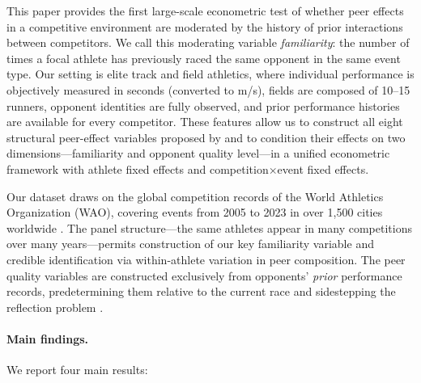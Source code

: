 \documentclass[12pt]{article}
\theoremstyle{definition}
\theoremstyle{remark}
\begin{document}
This paper provides the first large-scale econometric test of whether peer effects
in a competitive environment are moderated by the history of prior interactions
between competitors.
We call this moderating variable \textit{familiarity}: the number of times
a focal athlete has previously raced the same opponent in the same event type.
Our setting is elite track and field athletics, where individual performance
is objectively measured in seconds (converted to m/s), fields are composed of
10--15 runners, opponent identities are fully observed, and prior performance
histories are available for every competitor.
These features allow us to construct all eight structural peer-effect variables
proposed by \citet{HoxbyWeingarth2007} and to condition their effects on two
dimensions---familiarity and opponent quality level---in a unified econometric
framework with athlete fixed effects and competition$\times$event fixed effects.

Our dataset draws on the global competition records of the World Athletics
Organization (WAO), covering events from 2005 to 2023 in over 1{,}500 cities
worldwide \citep{AragonRezazadeh2025}.
The panel structure---the same athletes appear in many competitions over many
years---permits construction of our key familiarity variable and credible
identification via within-athlete variation in peer composition.
The peer quality variables are constructed exclusively from opponents' \textit{prior}
performance records, predetermining them relative to the current race and
sidestepping the reflection problem \citep{Manski1993,Angrist2014}.

\paragraph{Main findings.}
We report four main results:
\end{document}
